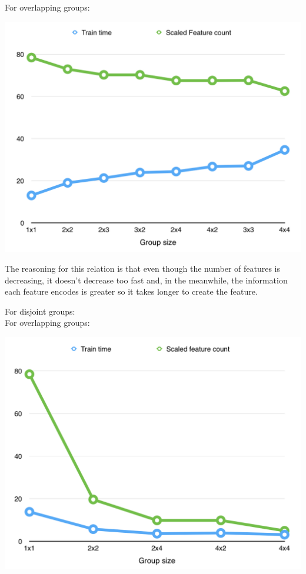 \documentclass[11pt]{article}
\begin{document}
For overlapping groups:\\
\begin{center}
\includegraphics[scale=0.8]{part1/2/overlap_time_feature.png}
\end{center}

The reasoning for this relation is that even though the number of features is decreasing, it doesn't decrease too fast and, in the meanwhile, the information each feature encodes is greater so it takes longer to create the feature.

For disjoint groups:\\
For overlapping groups:\\
\begin{center}
\includegraphics[scale=0.8]{part1/2/disjoint_time_feature.png}
\end{center}
\end{document}
